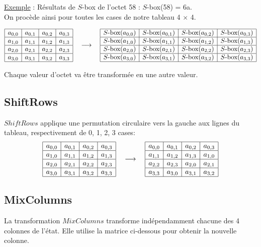 \noindent \underline{Exemple} : Résultats de $S$-box de l'octet 58 : $S$-box(58) = 6a. \\

On procède ainsi pour toutes les cases de notre tableau 4 $\times$ 4.

$$ \begin{array}{|c|c|c|c|} \hline a_{0,0} & a_{0,1} & a_{0,2} & a_{0,3} \\ \hline a_{1,0} & a_{1,1} & a_{1,2} & a_{1,3} \\ \hline a_{2,0} & a_{2,1} & a_{2,2} & a_{2,3} \\ \hline a_{3,0} & a_{3,1} & a_{3,2} & a_{3,3} \\ \hline \end{array} \quad \longrightarrow \quad 
  \begin{array}{|c|c|c|c|} \hline
  S\text{-box}(a_{0,0}) & S\text{-box}(a_{0,1}) & S\text{-box}(a_{0,2}) & S\text{-box}(a_{0,3}) \\ \hline
  S\text{-box}(a_{1,0}) & S\text{-box}(a_{1,1}) & S\text{-box}(a_{1,2}) & S\text{-box}(a_{1,3}) \\ \hline
  S\text{-box}(a_{2,0}) & S\text{-box}(a_{2,1}) & S\text{-box}(a_{2,2}) & S\text{-box}(a_{2,3}) \\ \hline
  S\text{-box}(a_{3,0}) & S\text{-box}(a_{3,1}) & S\text{-box}(a_{3,2}) & S\text{-box}(a_{3,3}) \\ \hline
  \end{array}
$$

Chaque valeur d'octet va être transformée en une autre valeur.

\subsection{ShiftRows}

$ShiftRows$ applique une permutation circulaire vers la gauche aux lignes du tableau, respectivement de 0, 1, 2, 3 cases:
$$ \begin{array}{|c|c|c|c|} \hline a_{0,0} & a_{0,1} & a_{0,2} & a_{0,3} \\ \hline a_{1,0} & a_{1,1} & a_{1,2} & a_{1,3} \\ \hline a_{2,0} & a_{2,1} & a_{2,2} & a_{2,3} \\ \hline a_{3,0} & a_{3,1} & a_{3,2} & a_{3,3} \\ \hline \end{array} \quad \longrightarrow \quad \begin{array}{|c|c|c|c|} \hline a_{0,0} & a_{0,1} & a_{0,2} & a_{0,3} \\ \hline a_{1,1} & a_{1,2} & a_{1,3} & a_{1,0} \\ \hline a_{2,2} & a_{2,3} & a_{2,0} & a_{2,1} \\ \hline a_{3,3} & a_{3,0} & a_{3,1} & a_{3,2} \\ \hline \end{array} $$

\subsection{MixColumns}
La transformation $MixColumns$ transforme indépendamment chacune des 4 colonnes de l'état. Elle utilise la matrice ci-dessous pour obtenir la nouvelle colonne. 


\def\MixColumn{\begin{pmatrix} 
  2 & 3 & 1 & 1 \\ 
  1 & 2 & 3 & 1 \\ 
  1 & 1 & 2 & 3 \\ 
  3 & 1 & 1 & 2 \\ 
  \end{pmatrix}}
 
\def\colonne#1{
 \begin{pmatrix}
  #1_{0,i} \\
  #1_{1,i} \\
  #1_{2,i} \\
  #1_{3,i}
  \end{pmatrix}
}

